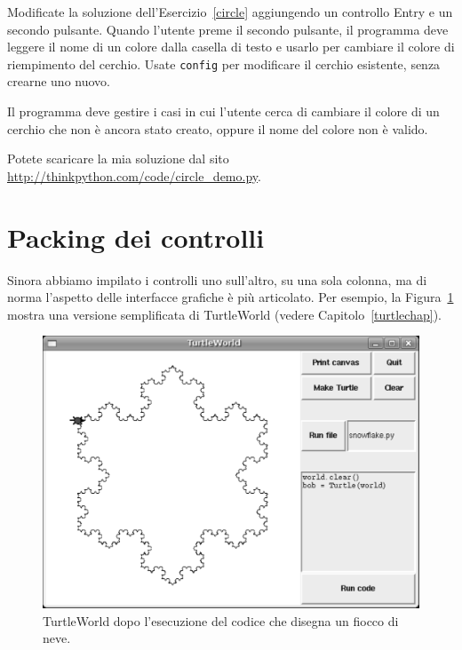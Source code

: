 \documentclass[10pt]{book}
\begin{document}
\vspace{0.2in}
\begin{exercise}
\label{circle2}

Modificate la soluzione dell'Esercizio~\ref{circle} aggiungendo un controllo Entry e un secondo pulsante. Quando l'utente preme il secondo pulsante, il programma deve leggere il nome di un colore dalla casella di testo e usarlo per cambiare il colore di riempimento del cerchio. Usate {\tt config}
per modificare il cerchio esistente, senza crearne uno nuovo.

Il programma deve gestire i casi in cui l'utente cerca di cambiare il colore di un cerchio che non è ancora stato creato, oppure il nome del colore non è valido.

Potete scaricare la mia soluzione dal sito \url{http://thinkpython.com/code/circle_demo.py}.

\end{exercise}


\section{Packing dei controlli}

Sinora abbiamo impilato i controlli uno sull'altro, su una sola colonna, ma di norma l'aspetto delle interfacce grafiche è più articolato. Per esempio, la Figura~\ref{fig.turtleworld} mostra una versione semplificata di
TurtleWorld (vedere Capitolo~\ref{turtlechap}).

\begin{figure}
\centerline{\includegraphics[scale=0.5]{figs/TurtleWorld.pdf}}
\caption{TurtleWorld dopo l'esecuzione del codice che disegna un fiocco di neve.}
\label{fig.turtleworld}
\end{figure}
\end{document}
